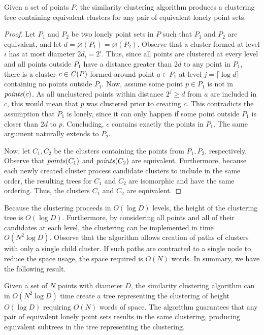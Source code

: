 \begin{lemma}\label{lem:clustAlg}
	Given a set of points $P$, the similarity clustering algorithm produces a clustering tree containing equivalent clusters for any pair of equivalent lonely point sets.
\end{lemma}
\begin{proof}
Let $P_1$ and $P_2$ be two lonely point sets in $P$ such that $P_1$ and $P_2$ are equivalent, and let $d = \diameter(P_1) = \diameter(P_2)$. Observe that a cluster formed at level $i$ has at most diameter $2d_i = 2^i$. Thus, since all points are clustered at every level and all points outside $P_1$ have a distance greater than $2d$ to any point in $P_1$, there is a cluster $c \in \mathit{C}(P)$ formed around point $a \in P_1$ at level $j = \lceil \log d \rceil$ containing no points outside $P_1$. Now, assume some point $p \in P_1$ is not in $\mathit{points}(c)$. As all unclustered points within distance $2^j \geq d$ from $a$ are included in $c$, this would mean that $p$ was clustered prior to creating $c$. This contradicts the assumption that $P_1$ is lonely, since it can only happen if some point outside $P_1$ is closer than $2d$ to $p$. Concluding, $c$ contains exactly the points in $P_1$. The same argument naturally extends to $P_2$.

Now, let $C_1, C_2$ be the clusters containing the points from $P_1, P_2$, respectively. Observe that $\mathit{points}(C_1)$ and $\mathit{points}(C_2)$ are equivalent. Furthermore, because each newly created cluster process candidate clusters to include in the same order, the resulting trees for $C_1$ and $C_2$ are isomorphic and have the same ordering. Thus, the clusters $C_1$ and $C_2$ are equivalent.
\end{proof}

Because the clustering proceeds in $O(\log D)$ levels, the height of the clustering tree is $O(\log D)$. Furthermore, by considering all points and all of their candidates at each level, the clustering can be implemented in time $O(N^2 \log D)$. Observe that the algorithm allows creation of paths of clusters with only a single child cluster. If such paths are contracted to a single node to reduce the space usage, the space required is $O(N)$ words. In summary, we have the following result. 

\begin{theorem}\label{thm:clustering}
	Given a set of $N$ points with diameter $D$, the similarity clustering algorithm can in $O(N^2 \log D)$ time create a tree representing the clustering of height $O(\log D)$ requiring $O(N)$ words of space. The algorithm guarantees that any pair of equivalent lonely point sets results in the same clustering, producing equivalent subtrees in the tree representing the clustering.
\end{theorem}

